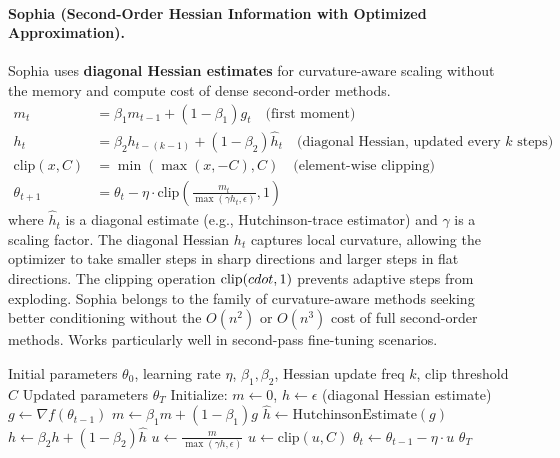 \documentclass[11pt,a4paper]{article}
\begin{document}
\paragraph{Sophia (Second-Order Hessian Information with Optimized Approximation).}
Sophia uses \textbf{diagonal Hessian estimates} for curvature-aware scaling without the memory and compute cost of dense second-order methods.\begin{align}
m_t &= \beta_1 m_{t-1} + (1-\beta_1) g_t \quad\text{(first moment)} \\
h_t &= \beta_2 h_{t-(k-1)} + (1-\beta_2) \hat{h}_t \quad\text{(diagonal Hessian, updated every $k$ steps)} \\
\text{clip}(x, C) &= \min(\max(x, -C), C) \quad\text{(element-wise clipping)} \\
\theta_{t+1} &= \theta_t - \eta \cdot \text{clip}\left(\frac{m_t}{\max(\gamma h_t, \epsilon)}, 1\right)
\end{align}
where $\hat{h}_t$ is a diagonal estimate (e.g., Hutchinson-trace estimator) and $\gamma$ is a scaling factor. The diagonal Hessian $h_t$ captures local curvature, allowing the optimizer to take smaller steps in sharp directions and larger steps in flat directions. The clipping operation $\text{clip}(\\cdot, 1)$ prevents adaptive steps from exploding. Sophia belongs to the family of curvature-aware methods seeking better conditioning without the $O(n^2)$ or $O(n^3)$ cost of full second-order methods. Works particularly well in second-pass fine-tuning scenarios.

\begin{algorithm}[H]
\caption{Sophia (Diagonal Hessian with Clipped Updates)}
\label{alg:sophia}
\begin{algorithmic}[1]
\Require Initial parameters $\theta_0$, learning rate $\eta$, $\beta_1, \beta_2$, Hessian update freq $k$, clip threshold $C$ 
\Ensure Updated parameters $\theta_T$
\State Initialize: $m \gets 0$, $h \gets \epsilon$ (diagonal Hessian estimate)
    \State $g \gets \nabla f(\theta_{t-1})$
    \State $m \gets \beta_1 m + (1-\beta_1) g$ 
        \State $\hat{h} \gets \text{HutchinsonEstimate}(g)$ 
        \State $h \gets \beta_2 h + (1-\beta_2) \hat{h}$ 
    \EndIf
    \State $u \gets \frac{m}{\max(\gamma h, \epsilon)}$ 
    \State $u \gets \text{clip}(u, C)$ 
    \State $\theta_t \gets \theta_{t-1} - \eta \cdot u$
\EndFor
\Return $\theta_T$
\end{algorithmic}
\end{algorithm}
\end{document}
